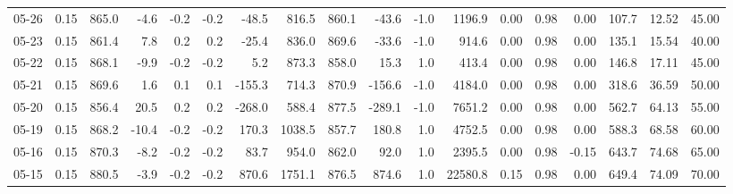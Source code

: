 \begin{threeparttable}
{\begin{tabular}{lrrrrrrrrrrrrrrrrr}
  05-26 &     0.15 & 865.0 &              -4.6 &              -0.2 &               -0.2 &              -48.5 &  816.5 & 860.1 &      -43.6 &                     -1.0 &              1196.9 &       0.00 &      0.98 &           0.00 &            107.7 &           12.52 &                  45.00 \\
  05-23 &     0.15 & 861.4 &               7.8 &               0.2 &                0.2 &              -25.4 &  836.0 & 869.6 &      -33.6 &                     -1.0 &               914.6 &       0.00 &      0.98 &           0.00 &            135.1 &           15.54 &                  40.00 \\
  05-22 &     0.15 & 868.1 &              -9.9 &              -0.2 &               -0.2 &                5.2 &  873.3 & 858.0 &       15.3 &                      1.0 &               413.4 &       0.00 &      0.98 &           0.00 &            146.8 &           17.11 &                  45.00 \\
  05-21 &     0.15 & 869.6 &               1.6 &               0.1 &                0.1 &             -155.3 &  714.3 & 870.9 &     -156.6 &                     -1.0 &              4184.0 &       0.00 &      0.98 &           0.00 &            318.6 &           36.59 &                  50.00 \\
  05-20 &     0.15 & 856.4 &              20.5 &               0.2 &                0.2 &             -268.0 &  588.4 & 877.5 &     -289.1 &                     -1.0 &              7651.2 &       0.00 &      0.98 &           0.00 &            562.7 &           64.13 &                  55.00 \\
  05-19 &     0.15 & 868.2 &             -10.4 &              -0.2 &               -0.2 &              170.3 & 1038.5 & 857.7 &      180.8 &                      1.0 &              4752.5 &       0.00 &      0.98 &           0.00 &            588.3 &           68.58 &                  60.00 \\
  05-16 &     0.15 & 870.3 &              -8.2 &              -0.2 &               -0.2 &               83.7 &  954.0 & 862.0 &       92.0 &                      1.0 &              2395.5 &       0.00 &      0.98 &          -0.15 &            643.7 &           74.68 &                  65.00 \\
  05-15 &     0.15 & 880.5 &              -3.9 &              -0.2 &               -0.2 &              870.6 & 1751.1 & 876.5 &      874.6 &                      1.0 &             22580.8 &       0.15 &      0.98 &           0.00 &            649.4 &           74.09 &                  70.00 \\

\end{tabular}}
\end{threeparttable}
